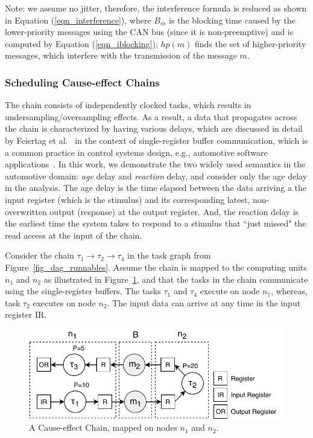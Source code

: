 Note: we assume no jitter, therefore, the interference formula is reduced as shown in Equation (\ref{eqn_interference}), where $B_m$ is the blocking time caused by the lower-priority messages using the CAN bus (since it is non-preemptive) and is computed by Equation (\ref{eqn_iblocking}); $hp(m)$ finds the set of higher-priority messages, which interfere with the transmission of the message $m$.

\subsubsection{Scheduling Cause-effect Chains}\label{subsec_cause-effect_chains}
The chain consists of independently clocked tasks, which results in undersampling/oversampling effects. As a result, a data that propagates across the chain is characterized by having various delays, which are discussed in detail by Feiertag et al.~\cite{Feiertag2009ASemantics} in the context of single-register buffer communication,  which is a common practice in control systems design, e.g., automotive software applications~\cite{Becker2017End-to-endSystems}. In this work, we demonstrate the two widely used semantics in the automotive domain: \textit{age} delay and \textit{reaction} delay, and consider only the age delay in the analysis. The age delay is the time elapsed between the data arriving a the input register (which is the stimulus) and its corresponding latest, non-overwritten output (response) at the output register. And, the reaction delay is the earliest time the system takes to respond to a stimulus that ``just missed" the read access at the input of the chain.

Consider the chain $\tau_1\rightarrow \tau_2\rightarrow \tau_4$ in the task graph from Figure~\ref{fig_dag_runnables}. Assume the chain is mapped to the computing units $n_1$ and $n_2$ as illustrated in Figure~\ref{fig_cause_effect_chain}, and that the tasks in the chain communicate using the single-register buffers. The tasks $\tau_1$ and $\tau_4$ execute on node $n_1$, whereas, task $\tau_2$ executes on node $n_2$. The input data can arrive at any time in the input register {\sffamily IR}. 
\begin{figure}
	\centering
	\includegraphics[width=0.7\linewidth]{img/cause_effect_chain_ntk}
	\caption{A Cause-effect Chain, mapped on nodes $n_1$ and $n_2$.}
	\label{fig_cause_effect_chain}
\end{figure}

